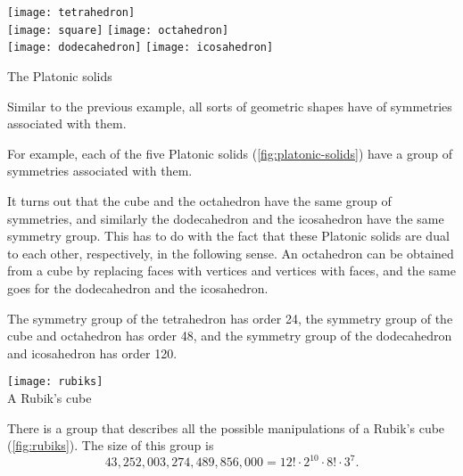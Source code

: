 \begin{marginfigure}
    \centering
    \texttt{[image: tetrahedron]} \\
    \texttt{[image: square]}
    \texttt{[image: octahedron]} \\
    \texttt{[image: dodecahedron]}
    \texttt{[image: icosahedron]}
    \caption{The Platonic solids}
    \label{fig:platonic-solids}
\end{marginfigure}


\begin{example}
    Similar to the previous example, all sorts of geometric shapes have  of symmetries associated with them.

    For example, each of the five Platonic solids (\cref{fig:platonic-solids}) have a group of symmetries associated with them.

    It turns out that the cube and the octahedron have the same group of symmetries, and similarly the dodecahedron and the icosahedron have the same symmetry group.
    This has to do with the fact that these Platonic solids are dual to each other, respectively, in the following sense.
    An octahedron can be obtained from a cube by replacing faces with vertices and vertices with faces, and the same goes for the dodecahedron and the icosahedron.

    The symmetry group of the tetrahedron has order 24, the symmetry group of the cube and octahedron has order 48, and the symmetry group of the dodecahedron and icosahedron has order 120.
\end{example}

\begin{marginfigure}
    \centering
    \texttt{[image: rubiks]} \\
    \caption{A Rubik's cube}
    \label{fig:rubiks}
\end{marginfigure}

\begin{example}
    There is a group that describes all the possible manipulations of a Rubik's cube (\cref{fig:rubiks}).
    The size of this group is
    \begin{equation}
        43,252,003,274,489,856,000 = 12! \cdot 2^{10} \cdot 8! \cdot 3^7.
    \end{equation}
\end{example}

